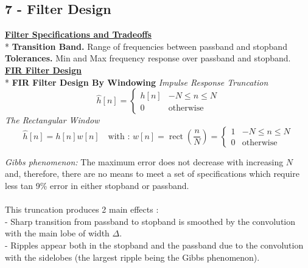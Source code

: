\documentclass{article}
\newcommand{\para}[1]{\textbf{\underline{#1}}\\*} %
\newcommand{\subpara}[1]{\textbf{#1}}
\begin{document}
\subsection{7 - Filter Design}
\begin{multicols}{2}
\para{Filter Specifications and Tradeoffs}
\subpara{Transition Band.} Range of frequencies between passband and stopband
\subpara{Tolerances.} Min and Max frequency response over passband and stopband.  
\\
\para{FIR Filter Design}
\subpara{FIR Filter Design By Windowing}
\textit{Impulse Response Truncation}
$$ \hat h [n] = \left \{ \begin{matrix} h[n] & -N \leq n \leq N \\ 0 & \text{otherwise} \end{matrix} \right . $$
\textit{The Rectangular Window}
$$ \hat h [n] = h[n]w[n] \quad \text{with : } w[n] = \operatorname{rect}\left ( \frac nN \right ) =
\left \{ \begin{matrix} 1 & -N \leq n \leq N \\ 0 & \text{otherwise} \end{matrix} \right . $$

\textit{Gibbs phenomenon:} The maximum error does not decrease with increasing $N$ and, therefore, there are no means to meet a set of specifications which require less tan 9\% error in either stopband or passband.
\\\\ This truncation produces 2 main effects : \\
- Sharp transition from passband to stopband is smoothed by the convolution with the main lobe of width $\Delta$.\\
- Ripples appear both in the stopband and the passband due to the convolution with the sidelobes (the largest ripple being the Gibbs phenomenon).

\end{multicols}


\end{document}
